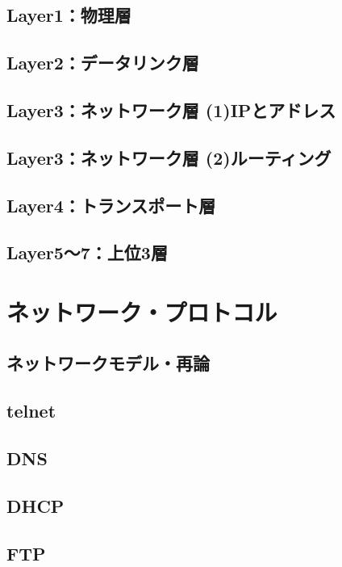 \documentclass[a4j,12pt]{jreport}
\begin{document}
\chapter{Layer1：物理層}

\chapter{Layer2：データリンク層}

\chapter{Layer3：ネットワーク層 (1)IPとアドレス}

\chapter{Layer3：ネットワーク層 (2)ルーティング}

\chapter{Layer4：トランスポート層}

\chapter{Layer5〜7：上位3層}


\part{ネットワーク・プロトコル}

\chapter{ネットワークモデル・再論}

\chapter{telnet}

\chapter{DNS}

\chapter{DHCP}

\chapter{FTP}
\end{document}
